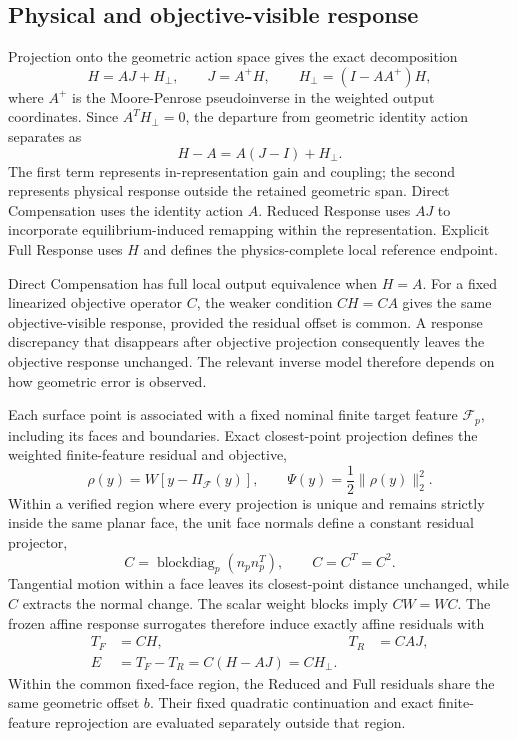 \subsection{Physical and objective-visible response}
\label{sec:physical_objective_visible_response}

Projection onto the geometric action space gives the exact decomposition
\begin{equation}
H=AJ+H_\perp,
\qquad
J=A^+H,
\qquad
H_\perp=(I-AA^+)H,
\label{eq:response_decomposition}
\end{equation}
where \(A^+\) is the Moore-Penrose pseudoinverse in the weighted output coordinates. Since \(A^TH_\perp=0\), the departure from geometric identity action separates as
\[
H-A=A(J-I)+H_\perp.
\]
The first term represents in-representation gain and coupling; the second represents physical response outside the retained geometric span. Direct Compensation uses the identity action \(A\). Reduced Response uses \(AJ\) to incorporate equilibrium-induced remapping within the representation. Explicit Full Response uses \(H\) and defines the physics-complete local reference endpoint.

Direct Compensation has full local output equivalence when \(H=A\). For a fixed linearized objective operator \(C\), the weaker condition \(CH=CA\) gives the same objective-visible response, provided the residual offset is common. A response discrepancy that disappears after objective projection consequently leaves the objective response unchanged. The relevant inverse model therefore depends on how geometric error is observed.

Each surface point is associated with a fixed nominal finite target feature \(\mathcal F_p\), including its faces and boundaries. Exact closest-point projection defines the weighted finite-feature residual and objective,
\begin{equation}
\rho(y)=W[y-\Pi_{\mathcal F}(y)],
\qquad
\Psi(y)=\frac12\|\rho(y)\|_2^2.
\label{eq:finite_feature_objective}
\end{equation}
Within a verified region where every projection is unique and remains strictly inside the same planar face, the unit face normals define a constant residual projector,
\[
C=\operatorname{blockdiag}_p(n_pn_p^T),
\qquad C=C^T=C^2.
\]
Tangential motion within a face leaves its closest-point distance unchanged, while \(C\) extracts the normal change. The scalar weight blocks imply \(CW=WC\). The frozen affine response surrogates therefore induce exactly affine residuals with
\begin{equation}
\begin{aligned}
T_F&=CH, & T_R&=CAJ,\\
E&=T_F-T_R=C(H-AJ)=CH_\perp.
\end{aligned}
\label{eq:objective_visible_response}
\end{equation}
Within the common fixed-face region, the Reduced and Full residuals share the same geometric offset \(b\). Their fixed quadratic continuation and exact finite-feature reprojection are evaluated separately outside that region.

